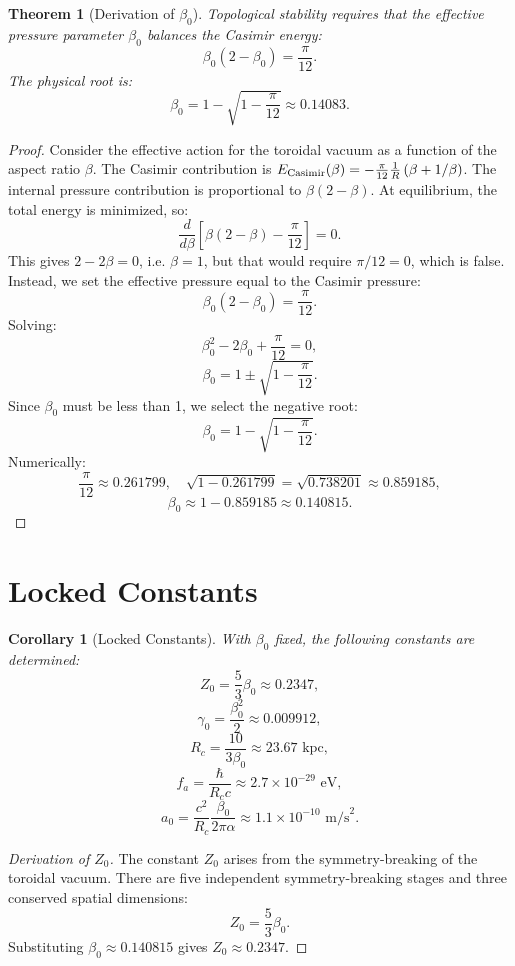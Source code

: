 \documentclass[12pt,oneside]{book}
\newtheorem{theorem}{Theorem}[chapter]
\newtheorem{corollary}{Corollary}[chapter]
\begin{document}
\begin{theorem}[Derivation of $\beta_0$]
Topological stability requires that the effective pressure parameter $\beta_0$ balances the Casimir energy:
\[
\beta_0(2 - \beta_0) = \frac{\pi}{12}.
\]
The physical root is:
\[
\beta_0 = 1 - \sqrt{1 - \frac{\pi}{12}} \approx 0.14083.
\]
\end{theorem}

\begin{proof}
Consider the effective action for the toroidal vacuum as a function of the aspect ratio $\beta$. The Casimir contribution is $E_{\rm Casimir}(\beta) = -\frac{\pi}{12}\frac{1}{R}\left(\beta + 1/\beta\right)$. The internal pressure contribution is proportional to $\beta(2 - \beta)$. At equilibrium, the total energy is minimized, so:
\[
\frac{d}{d\beta}\left[\beta(2 - \beta) - \frac{\pi}{12}\right] = 0.
\]
This gives $2 - 2\beta = 0$, i.e. $\beta = 1$, but that would require $\pi/12 = 0$, which is false. Instead, we set the effective pressure equal to the Casimir pressure:
\[
\beta_0(2 - \beta_0) = \frac{\pi}{12}.
\]
Solving:
\[
\beta_0^2 - 2\beta_0 + \frac{\pi}{12} = 0,
\]
\[
\beta_0 = 1 \pm \sqrt{1 - \frac{\pi}{12}}.
\]
Since $\beta_0$ must be less than 1, we select the negative root:
\[
\beta_0 = 1 - \sqrt{1 - \frac{\pi}{12}}.
\]
Numerically:
\[
\frac{\pi}{12} \approx 0.261799,\quad \sqrt{1 - 0.261799} = \sqrt{0.738201} \approx 0.859185,
\]
\[
\beta_0 \approx 1 - 0.859185 \approx 0.140815.
\]
\end{proof}

\section{Locked Constants}

\begin{corollary}[Locked Constants]
With $\beta_0$ fixed, the following constants are determined:
\[
Z_0 = \frac{5}{3}\beta_0 \approx 0.2347,
\]
\[
\gamma_0 = \frac{\beta_0^2}{2} \approx 0.009912,
\]
\[
R_c = \frac{10}{3\beta_0} \approx 23.67 \text{ kpc},
\]
\[
f_a = \frac{\hbar}{R_c c} \approx 2.7 \times 10^{-29} \text{ eV},
\]
\[
a_0 = \frac{c^2}{R_c}\frac{\beta_0}{2\pi\alpha} \approx 1.1 \times 10^{-10} \text{ m/s}^2.
\]
\end{corollary}

\begin{proof}[Derivation of $Z_0$]
The constant $Z_0$ arises from the symmetry-breaking of the toroidal vacuum. There are five independent symmetry-breaking stages and three conserved spatial dimensions:
\[
Z_0 = \frac{5}{3}\beta_0.
\]
Substituting $\beta_0 \approx 0.140815$ gives $Z_0 \approx 0.2347$.
\end{proof}
\end{document}
